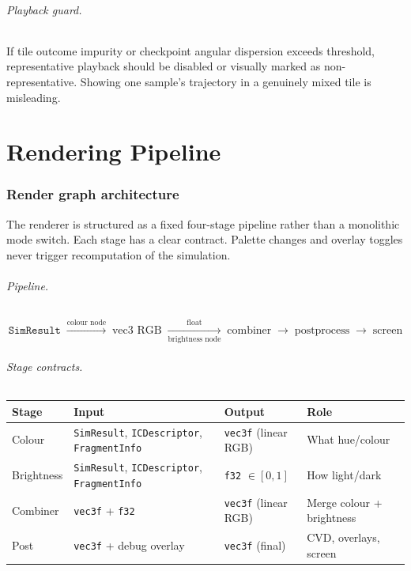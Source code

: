 \documentclass[11pt]{report}
\begin{document}
\paragraph{Playback guard.} If tile outcome impurity or checkpoint angular dispersion exceeds threshold, representative playback should be disabled or visually marked as non-representative. Showing one sample's trajectory in a genuinely mixed tile is misleading.

\newpage
\part{Rendering Pipeline}
\label{part:rendering}

\section{Render graph architecture}
\label{sec:render_graph}

The renderer is structured as a fixed four-stage pipeline rather than a monolithic mode switch. Each stage has a clear contract. Palette changes and overlay toggles never trigger recomputation of the simulation.

\paragraph{Pipeline.}
\[
\texttt{SimResult} \;\xrightarrow{\text{colour node}}\; \text{vec3 RGB} \;\xrightarrow[\text{brightness node}]{\text{float}}\; \text{combiner} \;\to\; \text{postprocess} \;\to\; \text{screen}
\]

\paragraph{Stage contracts.}
\begin{center}
\begin{tabular}{llll}
\toprule
Stage & Input & Output & Role \\
\midrule
Colour & \texttt{SimResult}, \texttt{ICDescriptor}, \texttt{FragmentInfo} & \texttt{vec3f} (linear RGB) & What hue/colour \\
Brightness & \texttt{SimResult}, \texttt{ICDescriptor}, \texttt{FragmentInfo} & \texttt{f32} $\in [0,1]$ & How light/dark \\
Combiner & \texttt{vec3f} + \texttt{f32} & \texttt{vec3f} (linear RGB) & Merge colour + brightness \\
Post & \texttt{vec3f} + debug overlay & \texttt{vec3f} (final) & CVD, overlays, screen \\
\bottomrule
\end{tabular}
\end{center}
\end{document}
